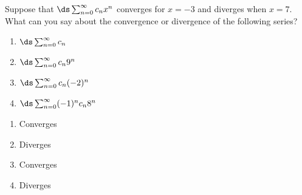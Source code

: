 {Suppose that $\ds \sum_{n=0}^\infty c_n x^n$ converges for $x=-3$ and diverges when $x=7$. What can you say about the convergence or divergence of the following series?
\begin{enumerate}
 \item  $\ds \sum_{n=0}^\infty c_n$
\item  $\ds \sum_{n=0}^\infty c_n 9^n$
\item  $\ds \sum_{n=0}^\infty c_n(-2)^n$
\item  $\ds \sum_{n=0}^\infty (-1)^n c_n 8^n$
\end{enumerate}}
{\begin{enumerate}
 \item  Converges
\item  Diverges
\item  Converges
\item  Diverges
\end{enumerate}}